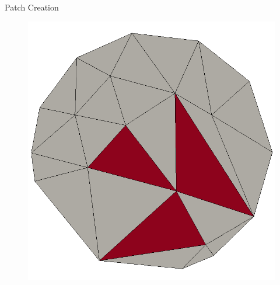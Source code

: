 \documentclass{beamer}
\begin{document}
\begin{frame}[plain]{Patch Creation}
\begin{figure}
\begin{minipage}{.24\textwidth}
    \end{minipage} 
    \begin{minipage}{0.24\textwidth}
      \centering
      \includegraphics[width=1\linewidth]{../image/patch3.png}
    \end{minipage}
  \end{figure}

\end{frame}

\end{document}
